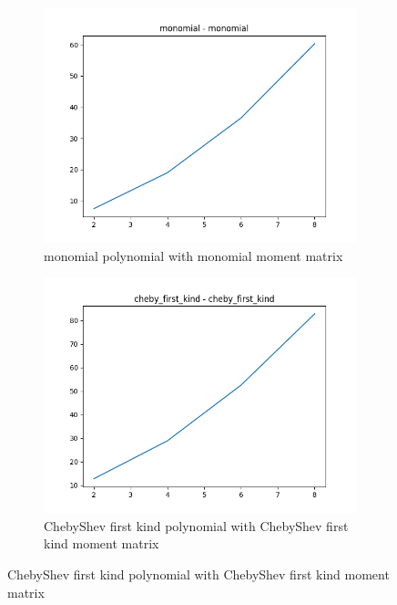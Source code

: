 \documentclass[12pt]{amsart}
\numberwithin{equation}{section}
\theoremstyle{definition}
\numberwithin{thm}{section}
\begin{document}
\begin{figure}[h]
     \centering
     \begin{subfigure}[b]{0.475\textwidth}
         \centering
         \includegraphics[width=\textwidth]{imgs_biv/monomial_monomial.png}
         \caption[Monomial polynomial with monomial moment matrix]%
         {\small monomial polynomial with monomial moment matrix}%

     \end{subfigure}
     \hfill
     \begin{subfigure}[b]{0.475\textwidth}  
         \centering 
         \includegraphics[width=\textwidth]{imgs_biv/cheby_first_kind_cheby_first_kind.png}
         \caption[ChebyShev first kind polynomial with ChebyShev first kind moment matrix]%
         {\small ChebyShev first kind polynomial with ChebyShev first kind moment matrix}%
 

\end{subfigure}
\end{figure}
\end{document}
